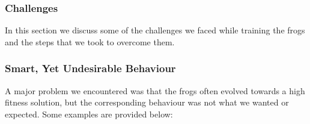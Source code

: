 \subsubsection{Challenges}

In this section we discuss some of the challenges we faced while training the frogs and the steps that we took to overcome them.

\subsubsection{Smart, Yet Undesirable Behaviour}

A major problem we encountered was that the frogs often evolved towards a high fitness solution, but the corresponding behaviour was not what we wanted or expected. Some examples are provided below:\\

